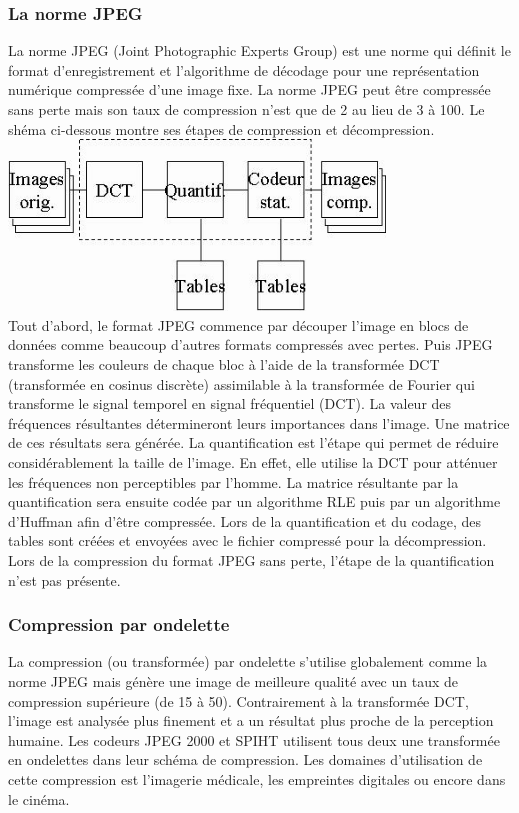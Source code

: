 \documentclass[a4paper]{report}
\begin{document}
	\subsubsection{La norme JPEG}
		La norme JPEG (Joint Photographic Experts Group) est une norme qui définit le format d'enregistrement et l'algorithme de décodage pour une représentation numérique compressée d'une image fixe. La norme JPEG peut être compressée sans perte mais son taux de compression n'est que de 2 au lieu de 3 à 100.
Le shéma ci-dessous montre ses étapes de compression et décompression.\\
		\includegraphics[width=10cm]{img/schema.jpg} \\
		Tout d'abord, le format JPEG commence par découper l'image en blocs de données comme beaucoup d'autres formats compressés avec pertes. Puis JPEG transforme les couleurs de chaque bloc à l'aide de la transformée DCT (transformée en cosinus discrète) assimilable à la transformée de Fourier qui transforme le signal temporel en signal fréquentiel (DCT). La valeur des fréquences résultantes détermineront leurs importances dans l'image. Une matrice de ces résultats sera générée. La quantification est l'étape qui permet de réduire considérablement la taille de l'image. En effet, elle utilise la DCT pour atténuer les fréquences non perceptibles par l'homme. La matrice résultante par la quantification sera ensuite codée par un algorithme RLE puis par un algorithme d'Huffman afin d'être compressée. Lors de la quantification et du codage, des tables sont créées et envoyées avec le fichier compressé pour la décompression.\\
	Lors de la compression du format JPEG sans perte, l'étape de la quantification n'est pas présente.

	\subsubsection{Compression par ondelette}
		La compression (ou transformée) par ondelette s'utilise globalement comme la norme JPEG mais génère une image de meilleure qualité avec un taux de compression supérieure (de 15 à 50). Contrairement à la transformée DCT, l'image est analysée plus finement et a un résultat plus proche de la perception humaine. Les codeurs JPEG 2000 et SPIHT utilisent tous deux une transformée en ondelettes dans leur schéma de compression. Les domaines d'utilisation de cette compression est l'imagerie médicale, les empreintes digitales ou encore dans le cinéma.
\end{document}
